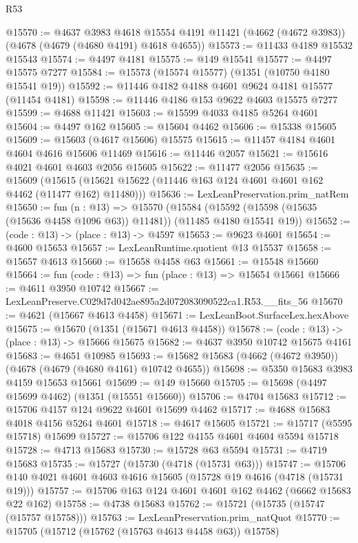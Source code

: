 \begin{lexlean}{R53}
\begin{coremodule}
@15570 := @4637
    @3983
    @4618
    @15554
    @4191
    @11421
    (@4662 (@4672 @3983))
    (@4678 (@4679 (@4680 @4191) @4618 @4655))
@15573 := @11433 @4189 @15532 @15543
@15574 := @4497 @4181
@15575 := @149 @15541
@15577 := @4497 @15575 @7277
@15584 := @15573 (@15574 @15577) (@1351 (@10750 @4180 @15541 @19))
@15592 := @11446 @4182 @4188 @4601 @9624 @4181 @15577 (@11454 @4181)
@15598 := @11446 @4186 @153 @9622 @4603 @15575 @7277
@15599 := @4688 @11421
@15603 := @15599 @4033 @4185 @5264 @4601
@15604 := @4497 @162
@15605 := @15604 @4462
@15606 := @15338 @15605
@15609 := @15603 (@4617 @15606) @15575
@15615 := @11457 @4184 @4601 @4604 @4616 @15606 @11469
@15616 := @11446 @2057
@15621 := @15616 @4021 @4601 @4603 @2056 @15605
@15622 := @11477 @2056
@15635 := @15609
    (@15615 (@15621 @15622 (@11446 @163 @124 @4601 @4601 @162 @4462 (@11477 @162) @11480)))
@15636 := LexLeanPreservation.prim_natRem
@15650 := fun (n : @13) =>
  @15570
    (@15584 (@15592 (@15598 (@15635 (@15636 @4458 @1096 @63)) @11481)) (@11485 @4180 @15541 @19))
@15652 := (code : @13) -> (place : @13) -> @4597
@15653 := @9623 @4601
@15654 := @4600 @15653
@15657 := LexLeanRuntime.quotient @13 @15537
@15658 := @15657 @4613
@15660 := @15658 @4458 @63
@15661 := @15548 @15660
@15664 := fun (code : @13) => fun (place : @13) => @15654 @15661
@15666 := @4611 @3950 @10742
@15667 := LexLeanPreserve.C029d7d042ae895a2d072083090522ca1.R53.__fits_56
@15670 := @4621 (@15667 @4613 @4458)
@15671 := LexLeanBoot.SurfaceLex.hexAbove
@15675 := @15670 (@1351 (@15671 @4613 @4458))
@15678 := (code : @13) -> (place : @13) -> @15666 @15675
@15682 := @4637 @3950 @10742 @15675 @4161
@15683 := @4651 @10985
@15693 := @15682 @15683 (@4662 (@4672 @3950)) (@4678 (@4679 (@4680 @4161) @10742 @4655))
@15698 := @5350 @15683 @3983 @4159 @15653 @15661
@15699 := @149 @15660
@15705 := @15698 (@4497 @15699 @4462) (@1351 (@15551 @15660))
@15706 := @4704 @15683
@15712 := @15706 @4157 @124 @9622 @4601 @15699 @4462
@15717 := @4688 @15683 @4018 @4156 @5264 @4601
@15718 := @4617 @15605
@15721 := @15717 (@5595 @15718) @15699
@15727 := @15706 @122 @4155 @4601 @4604 @5594 @15718
@15728 := @4713 @15683
@15730 := @15728 @63 @5594
@15731 := @4719 @15683
@15735 := @15727 (@15730 (@4718 (@15731 @63)))
@15747 := @15706 @140 @4021 @4601 @4603 @4616 @15605 (@15728 @19 @4616 (@4718 (@15731 @19)))
@15757 := @15706 @163 @124 @4601 @4601 @162 @4462 (@6662 @15683 @22 @162)
@15758 := @4738 @15683
@15762 := @15721 (@15735 (@15747 (@15757 @15758)))
@15763 := LexLeanPreservation.prim_natQuot
@15770 := @15705 (@15712 (@15762 (@15763 @4613 @4458 @63)) @15758)

\end{coremodule}
\end{lexlean}
